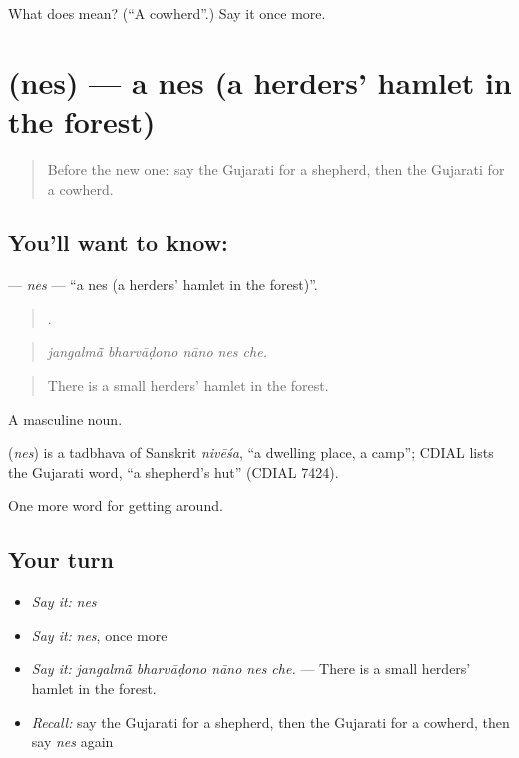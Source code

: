 \begin{tcolorbox}[breakable,colback=teal!4,colframe=teal!35!black,title={Before you move on}]
What does  mean? (\textquotedblleft{}A cowherd\textquotedblright{}.) Say it once more.
\end{tcolorbox}
\section[\texorpdfstring{\gu{નેસ} (nes)}{નેસ (nes)}]{ (nes) — a nes (a herders' hamlet in the forest)}

\label{lesson:GU-C446-nes}



\begin{quote}
Before the new one: say the Gujarati for a shepherd, then the Gujarati for a cowherd.
\end{quote}

\subsection*{You'll want to know: }
\textbf{} — \emph{nes} — \textquotedblleft{}a nes (a herders' hamlet in the forest)\textquotedblright{}.

\begin{quote}
    .
\end{quote}

\begin{quote}
\emph{jangalmā̃ bharvāḍono nāno nes che.}
\end{quote}

\begin{quote}
There is a small herders' hamlet in the forest.
\end{quote}

A masculine noun.

\begin{cousinweb}
\textbf{} (\emph{nes}) is a tadbhava of Sanskrit \emph{nivēśa}, \textquotedblleft{}a dwelling place, a camp\textquotedblright{}; CDIAL lists the Gujarati word, \textquotedblleft{}a shepherd's hut\textquotedblright{} (CDIAL 7424).
\end{cousinweb}

\begin{grammarlens}[title={What you've built}]
One more word for getting around.
\end{grammarlens}

\subsection*{Your turn}
\begin{itemize}
\raggedright
  \item \emph{Say it:} \emph{nes}
  \item \emph{Say it:} \emph{nes}, once more
  \item \emph{Say it:} \emph{jangalmā̃ bharvāḍono nāno nes che.} — There is a small herders' hamlet in the forest.
  \item \emph{Recall:} say the Gujarati for a shepherd, then the Gujarati for a cowherd, then say \emph{nes} again
\end{itemize}

